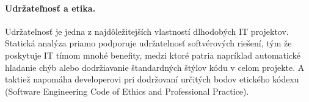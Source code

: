\documentclass[10pt,twoside,slovak,a4paper]{article}
\begin{document}
\paragraph{Udržateľnosť a etika.}
Udržateľnosť je jedna z najdôležitejších vlastností dlhodobých IT projektov. Statická analýza priamo podporuje
udržatelnosť softvérových riešení, tým že poskytuje IT tímom mnohé benefity, medzi ktoré patria napríklad automatické
hľadanie chýb alebo dodržiavanie štandardných štýlov kódu v celom projekte. A taktiež napomáha developerovi pri
dodržovaní určitých bodov etického kódexu (Software Engineering Code of Ethics and Professional Practice).



\end{document}
